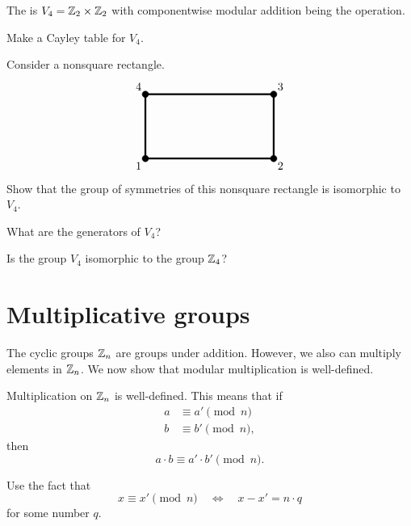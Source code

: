 \documentclass{ximera}
\begin{document}
\begin{definition}
  The  is $V_4 = \mathbb Z_2\times\mathbb Z_2$ with
  componentwise modular addition being the operation.
\end{definition}

\begin{exercise}
  Make a Cayley table for $V_4$.
\end{exercise}


\begin{exercise}
  Consider a nonsquare rectangle. 
  \[ 
  \begin{tikzpicture}
  \draw[ultra thick,rounded corners=.05mm] (0,0) -- (4,0) -- (4,2) -- (0,2)-- cycle;
  \draw[fill] (0,0) circle (1mm) node[below left] {$1$};
  \draw[fill] (4,0) circle (1mm) node[below right] {$2$};
  \draw[fill] (4,2) circle (1mm) node[above right] {$3$};
  \draw[fill] (0,2) circle (1mm) node[above left] {$4$};
  \end{tikzpicture}
  \]
  Show that the group of symmetries of this nonsquare rectangle is
  isomorphic to $V_4$.
\end{exercise}


\begin{exercise}
  What are the generators of $V_4$?
\end{exercise}

\begin{exercise}
  Is the group $V_4$ isomorphic to the group $\mathbb Z_4$?
\end{exercise}



\section{Multiplicative groups}


The cyclic groups $\mathbb Z_n$ are groups under addition. However, we also
can multiply elements in $\mathbb Z_n$. We now show that modular
multiplication is well-defined.

\begin{lemma}\label{L:mmwd}
  Multiplication on $\mathbb Z_n$ is well-defined. This means that if
  \begin{align*}
    a &\equiv a' \pmod{n}\\
    b &\equiv b' \pmod{n},
  \end{align*}
  then
  \[
  a\cdot b \equiv a'\cdot b' \pmod{n}.
  \]
  \begin{sketch}
    Use the fact that
    \[
    x \equiv x'\pmod{n} \quad \Leftrightarrow \quad x -x' = n\cdot q
    \]
    for some number $q$.
  \end{sketch}
\end{lemma}
\end{document}
